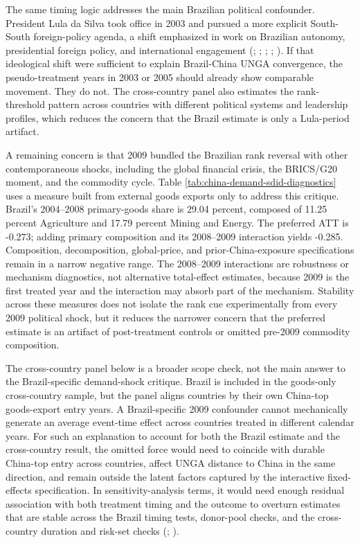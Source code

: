 \documentclass[
  12pt,
]{article}
\begin{document}
The same timing logic addresses the main Brazilian political confounder. President Lula da Silva took office in 2003 and pursued a more explicit South-South foreign-policy agenda, a shift emphasized in work on Brazilian autonomy, presidential foreign policy, and international engagement (; ; ; ; ). If that ideological shift were sufficient to explain Brazil-China UNGA convergence, the pseudo-treatment years in 2003 or 2005 should already show comparable movement. They do not. The cross-country panel also estimates the rank-threshold pattern across countries with different political systems and leadership profiles, which reduces the concern that the Brazil estimate is only a Lula-period artifact.

A remaining concern is that 2009 bundled the Brazilian rank reversal with other contemporaneous shocks, including the global financial crisis, the BRICS/G20 moment, and the commodity cycle. Table \ref{tab:china-demand-sdid-diagnostics} uses a measure built from external goods exports only to address this critique. Brazil's 2004--2008 primary-goods share is 29.04 percent, composed of 11.25 percent Agriculture and 17.79 percent Mining and Energy. The preferred ATT is -0.273; adding primary composition and its 2008--2009 interaction yields -0.285. Composition, decomposition, global-price, and prior-China-exposure specifications remain in a narrow negative range. The 2008--2009 interactions are robustness or mechanism diagnostics, not alternative total-effect estimates, because 2009 is the first treated year and the interaction may absorb part of the mechanism. Stability across these measures does not isolate the rank cue experimentally from every 2009 political shock, but it reduces the narrower concern that the preferred estimate is an artifact of post-treatment controls or omitted pre-2009 commodity composition.

The cross-country panel below is a broader scope check, not the main answer to the Brazil-specific demand-shock critique. Brazil is included in the goods-only cross-country sample, but the panel aligns countries by their own China-top goods-export entry years. A Brazil-specific 2009 confounder cannot mechanically generate an average event-time effect across countries treated in different calendar years. For such an explanation to account for both the Brazil estimate and the cross-country result, the omitted force would need to coincide with durable China-top entry across countries, affect UNGA distance to China in the same direction, and remain outside the latent factors captured by the interactive fixed-effects specification. In sensitivity-analysis terms, it would need enough residual association with both treatment timing and the outcome to overturn estimates that are stable across the Brazil timing tests, donor-pool checks, and the cross-country duration and risk-set checks (; ).
\end{document}
